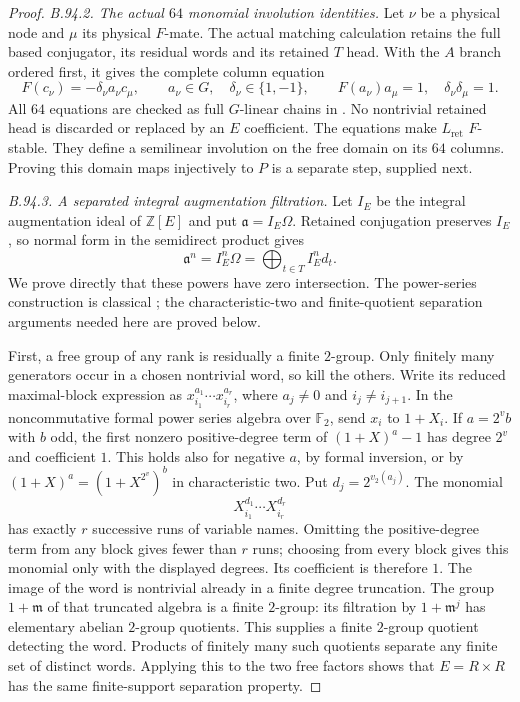 \begin{proof}
\emph{B.94.2. The actual $64$ monomial involution identities.}
Let $\nu$ be a physical node and $\mu$ its physical $F$-mate.
The actual matching calculation retains the full based conjugator,
its residual words and its retained $T$ head. With the $A$ branch
ordered first, it gives the complete column equation
\begin{equation}\label{eq:B94-mate}
 F(c_\nu)=-\delta_\nu a_\nu c_\mu,
 \qquad a_\nu\in G,\quad\delta_\nu\in\{1,-1\},
 \qquad F(a_\nu)a_\mu=1,
 \quad\delta_\nu\delta_\mu=1.
\end{equation}
All $64$ equations are checked as full $G$-linear chains in
.
No nontrivial retained head is discarded or replaced by an
$E$ coefficient. The equations make $L_{\mathrm{ret}}$ $F$-stable.
They define a semilinear involution on the free domain on its
$64$ columns. Proving this domain maps injectively to $P$ is
a separate step, supplied next.

\emph{B.94.3. A separated integral augmentation filtration.}
Let $I_E$ be the integral augmentation ideal of $\mathbb Z[E]$
and put $\mathfrak a=I_E\Omega$. Retained conjugation preserves
$I_E$, so normal form in the semidirect product gives
\begin{equation}\label{eq:B94-powers}
 \mathfrak a^n=I_E^n\Omega
       =\bigoplus_{t\in T}I_E^n d_t.
\end{equation}
We prove directly that these powers have zero intersection. The
power-series construction is classical
\citep[\S2, Satz I, pp.~262--263]{Magnus1935}; the characteristic-two
and finite-quotient separation arguments needed here are proved below.

First, a free group of any rank is residually a finite $2$-group.
Only finitely many generators occur in a chosen nontrivial word,
so kill the others. Write its reduced maximal-block expression as
$x_{i_1}^{a_1}\cdots x_{i_r}^{a_r}$, where $a_j\ne0$ and
$i_j\ne i_{j+1}$. In the noncommutative formal power series
algebra over $\mathbb F_2$, send $x_i$ to $1+X_i$.
If $a=2^v b$ with $b$ odd, the first nonzero positive-degree
term of $(1+X)^a-1$ has degree $2^v$ and coefficient $1$.
This holds also for negative $a$, by formal inversion, or by
$(1+X)^a=(1+X^{2^v})^b$ in characteristic two.
Put $d_j=2^{v_2(a_j)}$. The monomial
\[
                     X_{i_1}^{d_1}\cdots X_{i_r}^{d_r}
\]
has exactly $r$ successive runs of variable names. Omitting
the positive-degree term from any block gives fewer than $r$
runs; choosing from every block gives this monomial only with
the displayed degrees. Its coefficient is therefore $1$.
The image of the word is nontrivial already in a finite
degree truncation. The group $1+\mathfrak m$ of that truncated
algebra is a finite $2$-group: its filtration by
$1+\mathfrak m^j$ has elementary abelian $2$-group quotients.
This supplies a finite $2$-group quotient detecting the word.
Products of finitely many such quotients separate any finite
set of distinct words. Applying this to the two free factors
shows that $E=R\times R$ has the same finite-support separation
property.


\end{proof}
